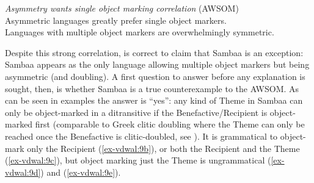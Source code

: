 \documentclass[output=paper
,modfonts
,nonflat]{langsci/langscibook}
\begin{document}
\begin{exe}
\ex \label{ex-vdwal:8} \textit{Asymmetry wants single object marking correlation} (AWSOM)\\ 
Asymmetric languages greatly prefer single object markers.\\
Languages with multiple object markers are overwhelmingly symmetric.
\end{exe}
Despite this strong correlation, \citet{Riedel2009} is correct to claim that Sambaa is an exception: Sambaa appears as the only language allowing multiple object markers but being asymmetric (and doubling). A first question to answer before any explanation is sought, then, is whether Sambaa is a true counterexample to the AWSOM. As can be seen in examples  the answer is ``yes'': any kind of Theme in Sambaa can only be object-marked in a ditransitive if the Benefactive/Recipient is object-marked first (comparable to Greek clitic doubling where the Theme can only be reached once the Benefactive is clitic-doubled, see \citealt{Anagnostopoulou2003, Anagnostopoulou2014}).
It is grammatical to object-mark only the Recipient (\ref{ex-vdwal:9b}), or both the Recipient and the Theme (\ref{ex-vdwal:9c}), but object marking just the Theme is ungrammatical (\ref{ex-vdwal:9d}) and (\ref{ex-vdwal:9e}).
\end{document}
